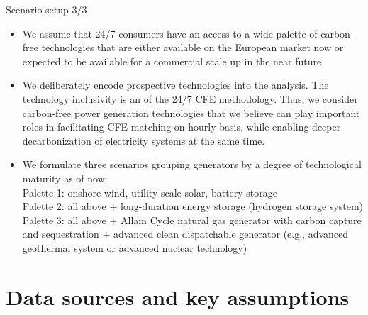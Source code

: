 \begin{frame}{Scenario setup 3/3}

  {\small 
  \begin{itemize}

  \item We assume that 24/7 consumers have an access to a wide palette
  of carbon-free technologies that are either available on the European market now
  or expected to be available for a commercial scale up in the near future. 
  
  \item We deliberately encode prospective technologies into the analysis.
  The \alert{technology inclusivity} is an 
  of the 24/7 CFE methodology. Thus, we consider carbon-free power generation
  technologies that we believe can play important roles in facilitating CFE matching on hourly basis, 
  while enabling deeper decarbonization of electricity systems at the same time. 
  
  \item We formulate three scenarios grouping generators by a degree of technological
  maturity as of now: \\
    \alert{Palette 1}: onshore wind, utility-scale solar, battery storage \\
    \alert{Palette 2}: all above + long-duration energy storage (hydrogen storage system) \\
    \alert{Palette 3}: all above + Allam Cycle natural gas generator with carbon capture and sequestration + 
    advanced clean dispatchable generator (e.g., advanced geothermal system or advanced nuclear technology)

  \end{itemize}
  }
\end{frame}



\section{Data sources and key assumptions}


